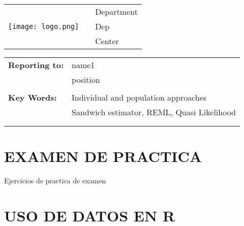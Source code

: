 \documentclass[letterpaper,11pt]{article}
\begin{document}


\vspace{-25pt}%

\begin{tabular}[t]{lp{1in}l}
	\multirow{5}{*}{\texttt{[image: logo.png]}} && Department \leavevmode  \\
																								&& Dep \\
																								&& Center\\
\end{tabular}


\leavevmode \newline \vspace{15pt} \newline\vspace{0.015in}

\begin{tabular}[h!]{p{2in} p{10in}}
	\rule{0pt}{4ex}\textbf{Reporting to:}          & name1  \\
																							   & position \\
                                                 & \\
	\rule{0pt}{4ex}\textbf{Key Words:}  					 & Individual and population approaches\\
																								 & Sandwich estimator, REML, Quasi Likelihood \\
 \mbox{$\quad$} \\
 \mbox{$\quad$} \\
\end{tabular}

\newpage
\noindent 



\section*{EXAMEN DE PRACTICA}

Ejercicios de practica de examen

\section{USO DE DATOS EN R}
\end{document}
